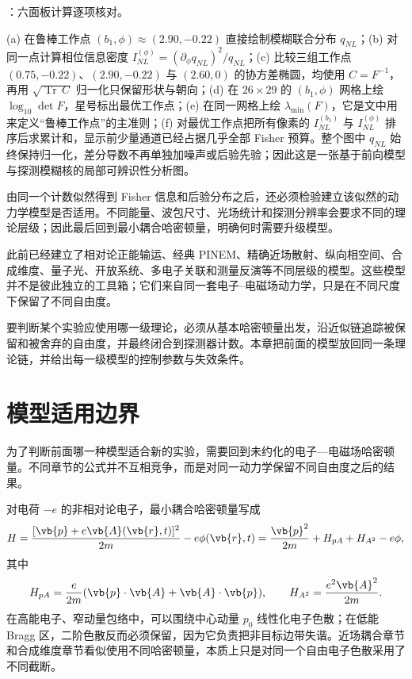 \noindent {}：六面板计算逐项核对。\par\noindent (a) 在鲁棒工作点 $(b_1,\phi)\approx(2.90,-0.22)$ 直接绘制模糊联合分布 $q_{NL}$；(b) 对同一点计算相位信息密度 $I^{(\phi)}_{NL}=(\partial_\phi q_{NL})^2/q_{NL}$；(c) 比较三组工作点 $(0.75,-0.22)$、$(2.90,-0.22)$ 与 $(2.60,0)$ 的协方差椭圆，均使用 $C=F^{-1}$，再用 $\sqrt{\operatorname{Tr}\,C}$ 归一化只保留形状与朝向；(d) 在 $26\times29$ 的 $(b_1,\phi)$ 网格上绘 $\log_{10}\det F$，星号标出最优工作点；(e) 在同一网格上绘 $\lambda_{\min}(F)$，它是文中用来定义“鲁棒工作点”的主准则；(f) 对最优工作点把所有像素的 $I^{(b_1)}_{NL}$ 与 $I^{(\phi)}_{NL}$ 排序后求累计和，显示前少量通道已经占据几乎全部 Fisher 预算。整个图中 $q_{NL}$ 始终保持归一化，差分导数不再单独加噪声或后验先验；因此这是一张基于前向模型与探测模糊核的局部可辨识性分析图。

\par\medskip
由同一个计数似然得到 Fisher 信息和后验分布之后，还必须检验建立该似然的动力学模型是否适用。不同能量、波包尺寸、光场统计和探测分辨率会要求不同的理论层级；因此最后回到最小耦合哈密顿量，明确何时需要升级模型。
\par\medskip


此前已经建立了相对论正能输运、经典 PINEM、精确近场散射、纵向相空间、合成维度、量子光、开放系统、多电子关联和测量反演等不同层级的模型。这些模型并不是彼此独立的工具箱；它们来自同一套电子--电磁场动力学，只是在不同尺度下保留了不同自由度。

要判断某个实验应使用哪一级理论，必须从基本哈密顿量出发，沿近似链追踪被保留和被舍弃的自由度，并最终闭合到探测器计数。本章把前面的模型放回同一条理论链，并给出每一级模型的控制参数与失效条件。


\section{模型适用边界}
为了判断前面哪一种模型适合新的实验，需要回到未约化的电子—电磁场哈密顿量。不同章节的公式并不互相竞争，而是对同一动力学保留不同自由度之后的结果。

对电荷 $-e$ 的非相对论电子，最小耦合哈密顿量写成
\begin{equation}
H=\frac{[\vb{p}+e\vb{A}(\vb{r},t)]^2}{2m}-e\phi(\vb{r},t)
=\frac{\vb{p}^2}{2m}+H_{pA}+H_{A^2}-e\phi,
\label{eq:ch08-minimal}
\end{equation}
其中
\begin{equation}
H_{pA}=\frac{e}{2m}(\vb{p}\cdot\vb{A}+\vb{A}\cdot\vb{p}),
\qquad
H_{A^2}=\frac{e^2\vb{A}^2}{2m}.
\label{eq:ch08-interactions}
\end{equation}
在高能电子、窄动量包络中，可以围绕中心动量 $p_0$ 线性化电子色散；在低能 Bragg 区，二阶色散反而必须保留，因为它负责把非目标边带失谐。近场耦合章节和合成维度章节看似使用不同哈密顿量，本质上只是对同一个自由电子色散采用了不同截断。

